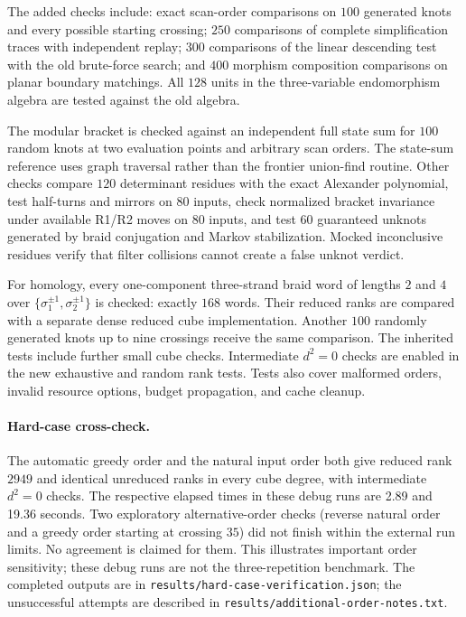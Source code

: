 \documentclass[11pt]{article}
\theoremstyle{remark}\newtheorem{remark}[theorem]{Remark}
\newcommand{\code}[1]{\texttt{\small #1}}
\begin{document}
The added checks include: exact scan-order comparisons on $100$ generated
knots and every possible starting crossing; $250$ comparisons of complete
simplification traces with independent replay; $300$ comparisons of the
linear descending test with the old brute-force search; and $400$ morphism
composition comparisons on planar boundary matchings. All $128$ units in
the three-variable endomorphism algebra are tested against the old algebra.

The modular bracket is checked against an independent full state sum for
$100$ random knots at two evaluation points and arbitrary scan orders.
The state-sum reference uses graph traversal rather than the frontier
union-find routine. Other checks compare $120$ determinant residues with
the exact Alexander polynomial, test half-turns and mirrors on $80$ inputs,
check normalized bracket invariance under available R1/R2 moves on $80$
inputs, and test $60$ guaranteed unknots generated by braid conjugation
and Markov stabilization. Mocked inconclusive residues verify that filter
collisions cannot create a false unknot verdict.

For homology, every one-component three-strand braid word of lengths $2$
and $4$ over $\{\sigma_1^{\pm1},\sigma_2^{\pm1}\}$ is checked: exactly
$168$ words. Their reduced ranks are compared with a separate dense reduced
cube implementation. Another $100$ randomly generated knots up to nine
crossings receive the same comparison. The inherited tests include further
small cube checks. Intermediate $d^2=0$ checks are enabled in the new
exhaustive and random rank tests. Tests also cover malformed orders,
invalid resource options, budget propagation, and cache cleanup.

\paragraph{Hard-case cross-check.}
The automatic greedy order and the natural input order both give reduced rank $2949$ and identical unreduced ranks in every cube degree, with intermediate $d^2=0$ checks. The respective elapsed times in these debug runs are 2.89 and 19.36 seconds. Two exploratory alternative-order checks (reverse natural order and a greedy order starting at crossing $35$) did not finish within the external run limits. No agreement is claimed for them. This illustrates important order sensitivity; these debug runs are not the three-repetition benchmark. The completed outputs are in \code{results/hard-case-verification.json}; the unsuccessful attempts are described in \code{results/additional-order-notes.txt}.
\end{document}

